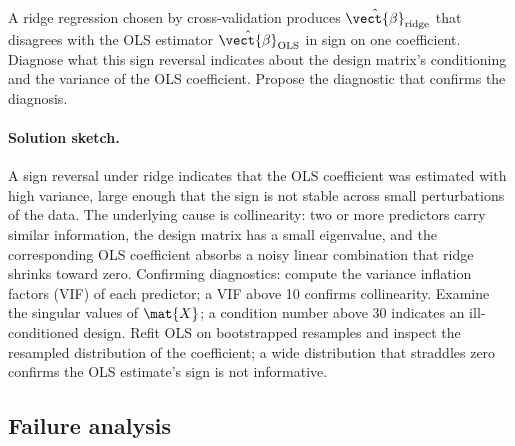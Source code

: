 \begin{exercise}
A ridge regression chosen by cross-validation produces
$\hat{\vect{\beta}}_{\mathrm{ridge}}$ that disagrees with the OLS
estimator $\hat{\vect{\beta}}_{\mathrm{OLS}}$ in sign on one
coefficient. Diagnose what this sign reversal indicates about the
design matrix's conditioning and the variance of the OLS
coefficient. Propose the diagnostic that confirms the diagnosis.

\paragraph{Solution sketch.} A sign reversal under ridge
indicates that the OLS coefficient was estimated with high
variance, large enough that the sign is not stable across small
perturbations of the data. The underlying cause is collinearity:
two or more predictors carry similar information, the design
matrix has a small eigenvalue, and the corresponding OLS
coefficient absorbs a noisy linear combination that ridge
shrinks toward zero. Confirming diagnostics: compute the
variance inflation factors (VIF) of each predictor; a VIF above
10 confirms collinearity. Examine the singular values of
$\mat{X}$; a condition number above $30$ indicates an
ill-conditioned design. Refit OLS on bootstrapped resamples and
inspect the resampled distribution of the coefficient; a wide
distribution that straddles zero confirms the OLS estimate's
sign is not informative.
\end{exercise}

\subsection*{Failure analysis}

